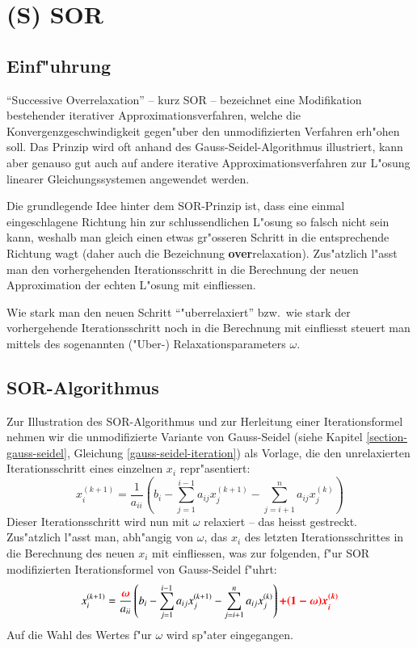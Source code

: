\chapter{(S) SOR\label{chapter:sor}}
\begin{refsection}

\section{Einf"uhrung}
``Successive Overrelaxation'' -- kurz SOR -- bezeichnet eine
Modifikation bestehender iterativer Approximationsverfahren, welche
die Konvergenzgeschwindigkeit gegen"uber den unmodifizierten Verfahren
erh"ohen soll. Das Prinzip wird oft anhand des Gauss-Seidel-Algorithmus
illustriert, kann aber genauso gut auch auf andere iterative
Approximationsverfahren zur L"osung linearer Gleichungssystemen angewendet
werden.

Die grundlegende Idee hinter dem SOR-Prinzip ist, dass eine einmal
eingeschlagene Richtung hin zur schlussendlichen L"osung so falsch
nicht sein kann, weshalb man gleich einen etwas gr"osseren Schritt
in die entsprechende Richtung wagt (daher auch die Bezeichnung
\textbf{over}relaxation). Zus"atzlich l"asst man den vorhergehenden
Iterationsschritt in die Berechnung der neuen Approximation der echten
L"osung mit einfliessen.

Wie stark man den neuen Schritt ``"uberrelaxiert'' bzw.~wie stark der
vorhergehende Iterationsschritt noch in die Berechnung mit einfliesst
steuert man mittels des sogenannten ("Uber-) Relaxationsparameters
$\omega$.
	
\section{SOR-Algorithmus\label{sec: SOR-Alg.}}
Zur Illustration des SOR-Algorithmus und zur Herleitung einer
Iterationsformel nehmen wir die unmodifizierte Variante von
Gauss-Seidel (siehe Kapitel \ref{section-gauss-seidel}, Gleichung
\ref{gauss-seidel-iteration}) als Vorlage, die den unrelaxierten
Iterationsschritt eines einzelnen $x_i$ repr"asentiert:
\begin{equation} \label{eq: G.-S.-It.formel}
	x_i^{(k+1)} = \frac{1}{a_{ii}}\left(b_i-\sum\limits_{j=1}^{i-1} a_{ij}x_j^{(k+1)}-\sum\limits_{j=i+1}^na_{ij}x_j^{(k)}\right)
\end{equation}
Dieser Iterationsschritt wird nun mit $\omega$ relaxiert -- das heisst
gestreckt. Zus"atzlich l"asst man, abh"angig von $\omega$, das $x_i$
des letzten Iterationsschrittes in die Berechnung des neuen $x_i$ mit
einfliessen, was zur folgenden, f"ur SOR modifizierten Iterationsformel
von Gauss-Seidel f"uhrt:
\begin{equation} \label{eq: SOR-It.formel1}
	x_i^{(k+1)} = \frac{\boldsymbol{\textcolor{red}{\omega}}}{a_{ii}}\left(b_i-\sum\limits_{j=1}^{i-1}a_{ij}x_j^{(k+1)}-\sum\limits_{j=i+1}^n a_{ij}x_j^{(k)}\right)\boldsymbol{\textcolor{red}{+(1-\omega)x_i^{(k)}}}
\end{equation}
Auf die Wahl des Wertes f"ur $\omega$ wird sp"ater eingegangen.
		

\end{refsection}
